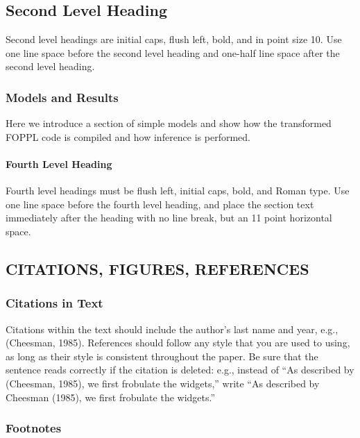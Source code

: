 \documentclass[twoside]{article}
\begin{document}
\subsection{Second Level Heading}

Second level headings are initial caps, flush left, bold, and in point
size 10. Use one line space before the second level heading and one-half line
space after the second level heading.

\subsubsection{Models and Results}

Here we introduce a section of simple models and show how the transformed FOPPL code is compiled and how inference is performed. 
\paragraph{Fourth Level Heading}

Fourth level headings must be flush left, initial caps, bold, and
Roman type.  Use one line space before the fourth level heading, and
place the section text immediately after the heading with no line
break, but an 11 point horizontal space.

\subsection{CITATIONS, FIGURES, REFERENCES}


\subsubsection{Citations in Text}

Citations within the text should include the author's last name and
year, e.g., (Cheesman, 1985). References should follow any style that
you are used to using, as long as their style is consistent throughout
the paper.  Be sure that the sentence reads correctly if the citation
is deleted: e.g., instead of ``As described by (Cheesman, 1985), we
first frobulate the widgets,'' write ``As described by Cheesman
(1985), we first frobulate the widgets.''  %

\subsubsection{Footnotes}
\end{document}
